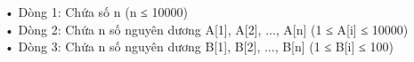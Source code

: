 • Dòng 1: Chứa số n (n ≤ 10000)
\\• Dòng 2: Chứa n số nguyên dương A[1], A[2], ..., A[n] (1 ≤ A[i] ≤ 10000)
\\• Dòng 3: Chứa n số nguyên dương B[1], B[2], ..., B[n] (1 ≤ B[i] ≤ 100)